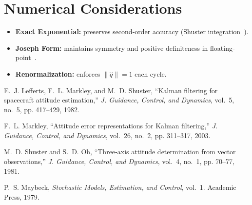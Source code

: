 \documentclass[11pt,letterpaper]{article}
\begin{document}
\section{Numerical Considerations}
\begin{itemize}
  \item \textbf{Exact Exponential:} preserves second‐order accuracy (Shuster integration~\cite{Shuster1981}).
  \item \textbf{Joseph Form:} maintains symmetry and positive definiteness in floating‐point~\cite{Maybeck1979}.
  \item \textbf{Renormalization:} enforces $\|\hat q\|=1$ each cycle.
\end{itemize}

\begin{thebibliography}{9}
E.~J. Lefferts, F.~L. Markley, and M.~D. Shuster, “Kalman filtering for spacecraft attitude estimation,” \emph{J. Guidance, Control, and Dynamics}, vol.~5, no.~5, pp. 417–429, 1982.

F.~L. Markley, “Attitude error representations for Kalman filtering,” \emph{J. Guidance, Control, and Dynamics}, vol.~26, no.~2, pp. 311–317, 2003.

M.~D. Shuster and S.~D. Oh, “Three‐axis attitude determination from vector observations,” \emph{J. Guidance, Control, and Dynamics}, vol.~4, no.~1, pp. 70–77, 1981.

P.~S. Maybeck, \emph{Stochastic Models, Estimation, and Control}, vol.~1. Academic Press, 1979.

\end{thebibliography}
\end{document}
